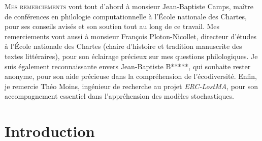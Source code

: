 \documentclass[a4paper,twoside,12pt]{book}
\begin{document}
\lettrine{M}{es remerciements} vont tout d'abord à monsieur Jean-Baptiste Camps, maître de conférences en philologie computationnelle à l’École nationale des Chartes, pour ses conseils avisés et son soutien tout au long de ce travail. Mes remerciements vont aussi à monsieur François Ploton-Nicollet, directeur d’études à l’École nationale des Chartes (chaire d’histoire et tradition manuscrite des textes littéraires), pour son éclairage précieux sur mes questions philologiques. Je suis également reconnaissante envers Jean-Baptiste B*****, qui souhaite rester anonyme, pour son aide précieuse dans la compréhension de l’écodiversité. Enfin, je remercie Théo Moins, ingénieur de recherche au projet \textit{ERC-LostMA}, pour son accompagnement essentiel dans l’appréhension des modèles stochastiques.

\clearpage
\thispagestyle{empty}
\cleardoublepage



\chapter*{Introduction}
\end{document}
